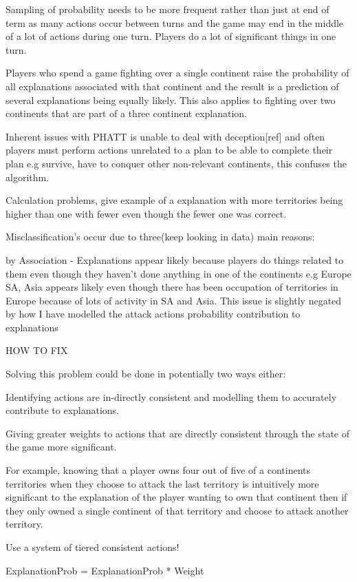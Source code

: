 \documentclass[parskip]{cs4rep}
\begin{document}
Sampling of probability needs to be more frequent rather than just at end of term as many actions occur between turns and the game may end in the middle of a lot of actions during one turn. Players do a lot of significant things in one turn.

Players who spend a game fighting over a single continent raise the probability of all explanations associated with that continent and the result is a prediction of several explanations being equally likely. This also applies to fighting over two continents that are part of a three continent explanation.

Inherent issues with PHATT is unable to deal with deception[ref] and often players must perform actions unrelated to a plan to be able to complete their plan e.g survive, have to conquer other non-relevant continents, this confuses the algorithm.

Calculation problems, give example of a explanation with more territories being higher than one with fewer even though the fewer one was correct.

Misclassification's occur due to three(keep looking in data) main reasons:

by Association - Explanations appear likely because players do things related to them even though they haven't done anything in one of the continents e.g Europe SA, Asia appears likely even though there has been occupation of territories in Europe because of lots of activity in SA and Asia. This issue is slightly negated by how I have modelled the attack actions probability contribution to explanations

HOW TO FIX

Solving this problem could be done in potentially two ways either:

Identifying actions are in-directly consistent and modelling them to accurately contribute to explanations.
 
Giving greater weights to actions that are directly consistent through the state of the game  more significant.

For example, knowing that a player owns four out of five of a continents territories when they choose to attack the last territory is intuitively more significant to the explanation of the player wanting to own that continent then if they only owned a single continent of that territory and choose to attack another territory.

Use a system of tiered consistent actions!

ExplanationProb = ExplanationProb * Weight
\end{document}
